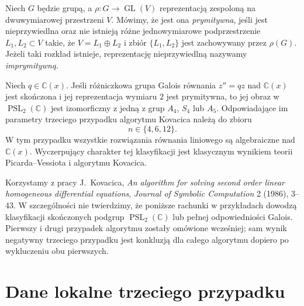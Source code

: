 \begin{definicja}
\label{aa:def:kov3-primitive}
Niech $G$ będzie grupą,
a $\rho:G\to\operatorname{GL}(V)$
reprezentacją zespoloną na
dwuwymiarowej przestrzeni $V$.
Mówimy, że jest ona
\emph{prymitywna}, jeśli
jest nieprzywiedlna oraz
nie istnieją różne
jednowymiarowe podprzestrzenie
$L_1,L_2\subset V$ takie, że
$V=L_1\oplus L_2$ i
zbiór $\{L_1,L_2\}$
jest zachowywany przez
$\rho(G)$.
Jeżeli taki rozkład
istnieje, reprezentację
nieprzywiedlną nazywamy
\emph{imprymitywną}.
\end{definicja}

\begin{twierdzenie}
\label{aa:tw:kov3-classification}
Niech $q\in\mathbb C(x)$.
Jeśli różniczkowa grupa Galois
równania $z''=qz$ nad $\mathbb C(x)$
jest skończona i jej reprezentacja
wymiaru $2$ jest prymitywna,
to jej obraz w
$\operatorname{PSL}_2(\mathbb C)$
jest izomorficzny z jedną z grup
$A_4$, $S_4$ lub $A_5$.
Odpowiadające im parametry
trzeciego przypadku algorytmu Kovacica
należą do zbioru
\[
 n\in\{4,6,12\}.
\]
W tym przypadku wszystkie
rozwiązania równania liniowego
są algebraiczne nad $\mathbb C(x)$.
Wyczerpujący charakter tej klasyfikacji
jest klasycznym wynikiem teorii
Picarda--Vessiota i algorytmu Kovacica.
\end{twierdzenie}

\begin{uwaga}[Źródło]
\label{aa:uw:kov3-classical}
Korzystamy z pracy J.~Kovacica,
\emph{An algorithm for solving second
order linear homogeneous differential
equations}, \emph{Journal of Symbolic
Computation} 2 (1986), 3--43.
W szczególności nie twierdzimy, że
poniższe rachunki w przykładach
dowodzą klasyfikacji skończonych
podgrup $\operatorname{PSL}_2(\mathbb C)$
lub pełnej odpowiedniości Galois.
Pierwszy i drugi przypadek algorytmu
zostały omówione wcześniej;
sam wynik negatywny trzeciego przypadku
jest konkluzją dla całego algorytmu
dopiero po wykluczeniu obu pierwszych.
\end{uwaga}

\section{Dane lokalne trzeciego przypadku}

